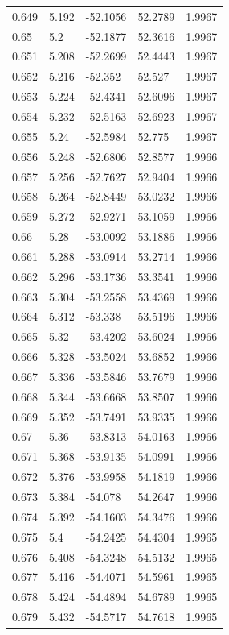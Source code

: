 \begin{tabular}{lllll}
0.649 & 5.192 & -52.1056 & 52.2789 & 1.9967 \\
0.65 & 5.2 & -52.1877 & 52.3616 & 1.9967 \\
0.651 & 5.208 & -52.2699 & 52.4443 & 1.9967 \\
0.652 & 5.216 & -52.352 & 52.527 & 1.9967 \\
0.653 & 5.224 & -52.4341 & 52.6096 & 1.9967 \\
0.654 & 5.232 & -52.5163 & 52.6923 & 1.9967 \\
0.655 & 5.24 & -52.5984 & 52.775 & 1.9967 \\
0.656 & 5.248 & -52.6806 & 52.8577 & 1.9966 \\
0.657 & 5.256 & -52.7627 & 52.9404 & 1.9966 \\
0.658 & 5.264 & -52.8449 & 53.0232 & 1.9966 \\
0.659 & 5.272 & -52.9271 & 53.1059 & 1.9966 \\
0.66 & 5.28 & -53.0092 & 53.1886 & 1.9966 \\
0.661 & 5.288 & -53.0914 & 53.2714 & 1.9966 \\
0.662 & 5.296 & -53.1736 & 53.3541 & 1.9966 \\
0.663 & 5.304 & -53.2558 & 53.4369 & 1.9966 \\
0.664 & 5.312 & -53.338 & 53.5196 & 1.9966 \\
0.665 & 5.32 & -53.4202 & 53.6024 & 1.9966 \\
0.666 & 5.328 & -53.5024 & 53.6852 & 1.9966 \\
0.667 & 5.336 & -53.5846 & 53.7679 & 1.9966 \\
0.668 & 5.344 & -53.6668 & 53.8507 & 1.9966 \\
0.669 & 5.352 & -53.7491 & 53.9335 & 1.9966 \\
0.67 & 5.36 & -53.8313 & 54.0163 & 1.9966 \\
0.671 & 5.368 & -53.9135 & 54.0991 & 1.9966 \\
0.672 & 5.376 & -53.9958 & 54.1819 & 1.9966 \\
0.673 & 5.384 & -54.078 & 54.2647 & 1.9966 \\
0.674 & 5.392 & -54.1603 & 54.3476 & 1.9966 \\
0.675 & 5.4 & -54.2425 & 54.4304 & 1.9965 \\
0.676 & 5.408 & -54.3248 & 54.5132 & 1.9965 \\
0.677 & 5.416 & -54.4071 & 54.5961 & 1.9965 \\
0.678 & 5.424 & -54.4894 & 54.6789 & 1.9965 \\
0.679 & 5.432 & -54.5717 & 54.7618 & 1.9965 \\

\end{tabular}
